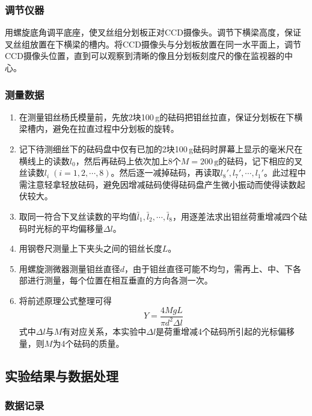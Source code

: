 \documentclass[zihao=5, UTF8]{article}
\theoremstyle{MyLineTheoremStyle} %
\theoremstyle{MyBlockTheoremStyle} %
\theoremstyle{MySubsubsectionStyle} %
\begin{document}
\subsubsection{调节仪器}
用螺旋底角调平底座，使叉丝组分划板正对CCD摄像头。调节下横梁高度，保证叉丝组放置在下横梁的槽内。将CCD摄像头与分划板放置在同一水平面上，调节CCD摄像头位置，直到可以观察到清晰的像且分划板刻度尺的像在监视器的中心。

\subsubsection{测量数据}

\begin{enumerate}
    \item 在测量钼丝杨氏模量前，先放2块100\,g的砝码把钼丝拉直，保证分划板在下横梁槽内，避免在拉直过程中分划板的旋转。
    \item 记下待测细丝下的砝码盘中仅有已加的2块100\,g砝码时屏幕上显示的毫米尺在横线上的读数$ l_0 $，然后再砝码上依次加上8个$ M=200\,\mathrm{g} $的砝码，记下相应的叉丝读数$ l_i\;(i=1,2,\cdots,8) $。然后逐一减掉砝码，再读取$ l_8',l_7',\cdots,l_1' $。此过程中需注意轻拿轻放砝码，避免因增减砝码使得砝码盘产生微小振动而使得读数起伏较大。
    \item 取同一符合下叉丝读数的平均值$ \bar l_1,\bar l_2,\cdots,\bar l_8 $，用逐差法求出钼丝荷重增减四个砝码时光标的平均偏移量$ \Delta l $。
    \item 用钢卷尺测量上下夹头之间的钼丝长度$ L $。
    \item 用螺旋测微器测量钼丝直径$ d $，由于钼丝直径可能不均匀，需再上、中、下各部进行测量，每个位置在相互垂直的方向各测一次。
    \item 将前述原理公式整理可得
	\begin{equation}\label{1-Yang}
		Y=\frac{4MgL}{\pi d^2\Delta l}
	\end{equation}
	式中$ \Delta l $与$ M $有对应关系，本实验中$ \Delta l $是荷重增减4个砝码所引起的光标偏移量，则$ M $为4个砝码的质量。
\end{enumerate}

\subsection{实验结果与数据处理}

\subsubsection{数据记录}
\end{document}
